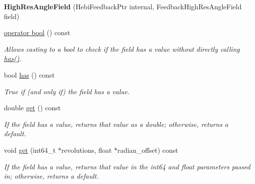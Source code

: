 \begin{DoxyCompactItemize}
\item 
{\bfseries High\+Res\+Angle\+Field} (Hebi\+Feedback\+Ptr internal, Feedback\+High\+Res\+Angle\+Field field)\hypertarget{classhebi_1_1Feedback_1_1HighResAngleField_a58cd10f4e873eff00070789de04bcaf2}{}\label{classhebi_1_1Feedback_1_1HighResAngleField_a58cd10f4e873eff00070789de04bcaf2}

\item 
\hyperlink{classhebi_1_1Feedback_1_1HighResAngleField_a0e5b3a62cbebf87fab67c6b2472a0c95}{operator bool} () const 
\begin{DoxyCompactList}\small\item\em Allows casting to a bool to check if the field has a value without directly calling {\ttfamily \hyperlink{classhebi_1_1Feedback_1_1HighResAngleField_a770a8c3fd520ed28cdadea60bed7b2d1}{has()}}. \end{DoxyCompactList}\item 
bool \hyperlink{classhebi_1_1Feedback_1_1HighResAngleField_a770a8c3fd520ed28cdadea60bed7b2d1}{has} () const \hypertarget{classhebi_1_1Feedback_1_1HighResAngleField_a770a8c3fd520ed28cdadea60bed7b2d1}{}\label{classhebi_1_1Feedback_1_1HighResAngleField_a770a8c3fd520ed28cdadea60bed7b2d1}

\begin{DoxyCompactList}\small\item\em True if (and only if) the field has a value. \end{DoxyCompactList}\item 
double \hyperlink{classhebi_1_1Feedback_1_1HighResAngleField_a7f3beeb902f88bd3956a5d3548d43eec}{get} () const 
\begin{DoxyCompactList}\small\item\em If the field has a value, returns that value as a double; otherwise, returns a default. \end{DoxyCompactList}\item 
void \hyperlink{classhebi_1_1Feedback_1_1HighResAngleField_a162ca0cfc811c5e073f90acf5782cc35}{get} (int64\+\_\+t $\ast$revolutions, float $\ast$radian\+\_\+offset) const 
\begin{DoxyCompactList}\small\item\em If the field has a value, returns that value in the int64 and float parameters passed in; otherwise, returns a default. \end{DoxyCompactList}\end{DoxyCompactItemize}


